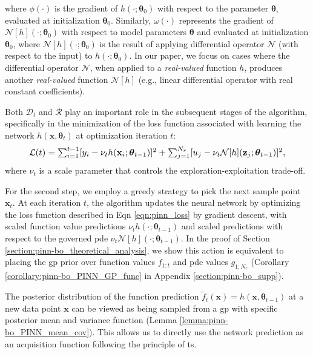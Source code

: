 where $\phi(\cdot)$ is the gradient of $h(\cdot; \boldsymbol{\theta}_0)$ with respect to the parameter $\boldsymbol{\theta}$, evaluated at initialization $\boldsymbol{\theta}_0$. Similarly, $\omega(\cdot)$ represents the gradient of $\mathcal{N}[h](\cdot; \boldsymbol{\theta}_0)$ with respect to model parameters $\boldsymbol{\theta}$ and evaluated at initialization $\boldsymbol{\theta}_0$, where $\mathcal{N}[h](\cdot; \boldsymbol{\theta}_0)$ is the result of applying differential operator $\mathcal{N}$ (with respect to the input) to $h(\cdot; \boldsymbol{\theta}_0)$. In our paper, we focus on cases where the differential operator \( \mathcal{N} \), when applied to a \textit{real-valued} function \( h \), produces another \textit{real-valued} function \( \mathcal{N}[h] \) (e.g., linear differential operator with real constant coefficients). 

Both $\mathcal{D}_t$ and $\mathcal{R}$ play an important role in the subsequent stages of the algorithm, specifically in the minimization of the loss function associated with learning the network $h(\mathbf{x}, \boldsymbol{\theta}_t)$ at optimization iteration $t$:
\begin{equation}
    \label{eqn:pinn_loss}
    \resizebox{0.9\textwidth}{!}{
$\mathcal{L}(t) = \sum^{t-1}_{i=1} [y_i - \nu_t h(\mathbf{x}_i; \boldsymbol{\theta}_{t-1})]^2 + \sum^{N_r}_{j=1}[u_j - \nu_t \mathcal{N}[h](\mathbf{z}_j; \boldsymbol{\theta}_{t-1})]^2$,
}
\end{equation}
where $\nu_t$ is a scale parameter that controls the exploration-exploitation trade-off. 

For the second step, we employ a greedy strategy to pick the next sample point $\mathbf{x}_t$. At each iteration $t$, the algorithm updates the neural network by optimizing the loss function described in Eqn \ref{eqn:pinn_loss} by gradient descent, with scaled function value predictions $\nu_t h(\cdot; \boldsymbol{\theta}_{t-1})$ and scaled predictions with respect to the governed \ac{pde} $\nu_t \mathcal{N}[h](\cdot; \boldsymbol{\theta}_{t-1})$. In the proof of Section \ref{section:pinn-bo_theoretical_analysis}, we show this action is equivalent to placing the \ac{gp} prior over function values $f_{1:t}$ and \ac{pde} values $g_{1:N_r}$ (Corollary \ref{corollary:pinn-bo_PINN_GP_func} in Appendix \ref{section:pinn-bo_supp}). 

The posterior distribution of the function prediction $\widetilde {f}_t(\mathbf{x}) = h(\mathbf{x}, \boldsymbol{\theta}_{t-1})$ at a new data point $\mathbf{x}$ can be viewed as being sampled from a \ac{gp} with specific posterior mean and variance function (Lemma \ref{lemma:pinn-bo_PINN_mean_cov}). This allows us to directly use the network prediction as an acquisition function following the principle of \acl{ts}.

